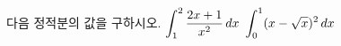다음 정적분의 값을 구하시오.
 $\displaystyle\int_{1}^{2}\dfrac{2x+1}{x^2}\mkern3mu dx$
 $\displaystyle\int_{0}^{1}(x-\sqrt{x})^2\mkern3mu dx$
